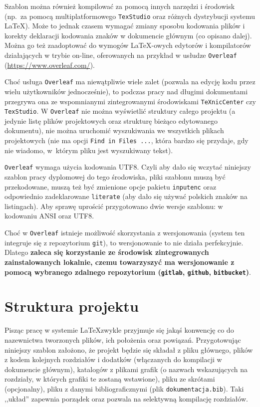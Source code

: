 Szablon można również kompilować za pomocą innych narzędzi i środowisk (np.\ za pomocą multiplatformowego \texttt{TexStudio} oraz różnych dystrybucji systemu \LaTeX). Może to jednak czasem wymagać zmiany sposobu kodowania plików i korekty deklaracji kodowania znaków w dokumencie głównym (co opisano dalej). 
Można go też zaadoptować do wymogów \LaTeX-owych edytorów i kompilatorów działających w trybie on-line, oferowanych na przykład w usłudze \texttt{Overleaf} (\url{https://www.overleaf.com/}). 

Choć usługa \texttt{Overleaf} ma niewątpliwie wiele zalet (pozwala na edycję kodu przez wielu użytkowników jednocześnie), to podczas pracy nad długimi dokumentami przegrywa ona ze wspomnianymi zintegrowanymi środowiskami \texttt{TeXnicCenter} czy \texttt{TexStudio}. W \texttt{Overleaf} nie można wyświetlić struktury całego projektu (a jedynie listę plików projektowych oraz strukturę bieżąco edytowanego dokumentu), nie można uruchomić wyszukiwania we wszystkich plikach projektowych (nie ma opcji  \texttt{Find in Files ...}, która bardzo się przydaje, gdy nie wiadomo, w~którym pliku jest wyszukiwany tekst). 

\texttt{Overleaf} wymaga użycia kodowania UTF8. Czyli aby dało się wczytać niniejszy szablon pracy dyplomowej do tego środowiska, pliki szablonu muszą być przekodowane, muszą też być zmienione opcje pakietu \texttt{inputenc} oraz odpowiednio zadeklarowane \texttt{literate} (aby dało się używać polskich znaków na listingach). Aby sprawę uprościć przygotowano dwie wersje szablonu: w kodowaniu ANSI oraz UTF8.

Choć w \texttt{Overleaf} istnieje możliwość skorzystania z wersjonowania (system ten integruje się z repozytorium \texttt{git}), to wersjonowanie to nie działa perfekcyjnie. Dlatego \textbf{zaleca się korzystanie ze środowisk zintegrowanych zainstalowanych lokalnie, czemu towarzyszyć ma wersjonowanie z pomocą wybranego zdalnego repozytorium (\texttt{gitlab}, \texttt{github}, \texttt{bitbucket})}.

\section{Struktura projektu}
Pisząc pracę w systemie \LaTeX zwykle przyjmuje się jakąś konwencję co do nazewnictwa tworzonych plików, ich położenia oraz powiązań. Przygotowując niniejszy szablon założono, że projekt będzie się składał z pliku głównego, plików z kodem kolejnych rozdziałów i dodatków (włączanych do kompilacji w dokumencie głównym), katalogów z plikami grafik (o nazwach wskazujących na rozdziały, w których grafiki te zostaną wstawione), pliku ze skrótami (opcjonalny), pliku z danymi bibliograficznymi (plik \texttt{dokumentacja.bib}). Taki ,,układ'' zapewnia porządek oraz pozwala na selektywną kompilację rozdziałów. 

